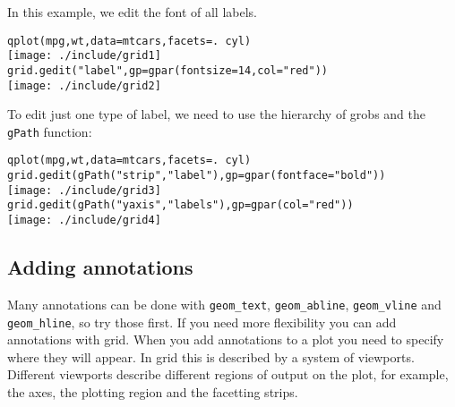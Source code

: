 In this example, we edit the font of all labels.

\begin{alltt}
qplot(mpg, wt, data=mtcars, facets = . ~ cyl)
\texttt{[image: ./include/grid1]}
grid.gedit("label", gp=gpar(fontsize=14, col="red"))
\texttt{[image: ./include/grid2]}
\end{alltt}

To edit just one type of label, we need to use the hierarchy of grobs and the {\tt gPath} function:

\begin{alltt}
qplot(mpg, wt, data=mtcars, facets = . ~ cyl)
grid.gedit(gPath("strip","label"), gp=gpar(fontface="bold"))
\texttt{[image: ./include/grid3]}
grid.gedit(gPath("yaxis", "labels"), gp=gpar(col="red"))
\texttt{[image: ./include/grid4]}
\end{alltt}

% 
% 


\subsection{Adding annotations}\label{sec:adding_annotation}

Many annotations can be done with {\tt geom\_text}, {\tt geom\_abline}, {\tt geom\_vline} and {\tt geom\_hline}, so try those first.  If you need more flexibility you can add annotations with grid.  When you add annotations to a plot you need to specify where they will appear.  In grid this is described by a system of viewports.  Different viewports describe different regions of output on the plot, for example, the axes, the plotting region and the facetting strips.

